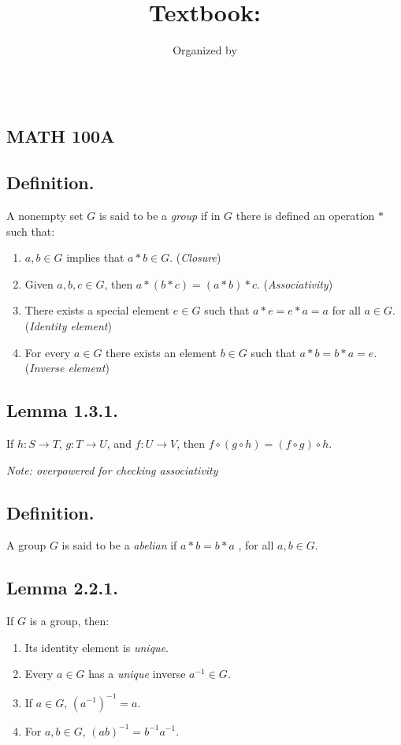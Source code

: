 \documentclass{article}
\title{
    \vspace{2in}
    \textsc{\Large\hmwkInstitution} \\
    \vspace{0.2in}
    \textmd{\textbf{\hmwkTitle}}\\
    \vspace{0.2in}\large{Textbook: \textit{\hmwkTextbook}}
}
\author{
  Organized by \hmwkAuthorName
}
\date{}
\newenvironment{lemma}[1]{\subsection*{Lemma #1.}}{}
\newenvironment{defn}{\subsection*{Definition.}}{}
\begin{document}
\maketitle

\thispagestyle{empty}
\clearpage
{} 

\pagebreak


\begin{center}
    \section*{\\ MATH 100A}
\end{center}

\vspace{0.2in}

\begin{defn}
    A nonempty set $G$ is said to be a \textit{group} if in $G$ there is defined an operation $*$ such that:
    \begin{enumerate}[label=(\alph*)]
        \item $a, b \in G$ implies that $a * b \in G$. (\textit{Closure})
        \item Given $a, b ,c \in G$, then $a * (b * c) = (a * b) * c$. (\textit{Associativity})
        \item There exists a special element $e \in G$ such that $a * e = e * a = a$ for all $a \in G$. (\textit{Identity element})
        \item For every $a \in G$ there exists an element $b \in G$ such that $a * b = b * a = e$. (\textit{Inverse element})
    \end{enumerate}
\end{defn}

\begin{lemma}{1.3.1}
    If $h: S \rightarrow T$, $g: T \rightarrow U$, and $f: U \rightarrow V$, then $f \circ (g \circ h) = (f \circ g) \circ h$.
    
    \textit{Note: overpowered for checking associativity}
\end{lemma}

\begin{defn}
    A group $G$ is said to be a \textit{abelian} if $a * b = b * a$ , for all $a, b \in G$.
\end{defn}

\begin{lemma}{2.2.1}
    If $G$ is a group, then:
    \begin{enumerate}[label=(\alph*)]
        \item Its identity element is \textit{unique}.
        \item Every $a \in G$ has a \textit{unique} inverse $a^{-1} \in G$.
        \item If $a \in G$, $(a^{-1})^{-1} = a$.
        \item For $a, b \in G$, $(ab)^{-1} = b^{-1}a^{-1}$.
    \end{enumerate}
\end{lemma}
\end{document}
